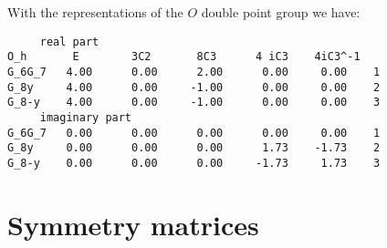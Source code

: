 \documentclass[12pt,a4paper]{article}
\begin{document}
With the representations of the $O$ double point group we have:
\begin{verbatim}
     real part
O_h       E        3C2       8C3      4 iC3    4iC3^-1 
G_6G_7   4.00      0.00      2.00      0.00     0.00    1
G_8y     4.00      0.00     -1.00      0.00     0.00    2
G_8-y    4.00      0.00     -1.00      0.00     0.00    3
     imaginary part
G_6G_7   0.00      0.00      0.00      0.00     0.00    1
G_8y     0.00      0.00      0.00      1.73    -1.73    2
G_8-y    0.00      0.00      0.00     -1.73     1.73    3
\end{verbatim}


\newpage
\section{\color{coral}Symmetry matrices
\label{section_sym}}
\end{document}
